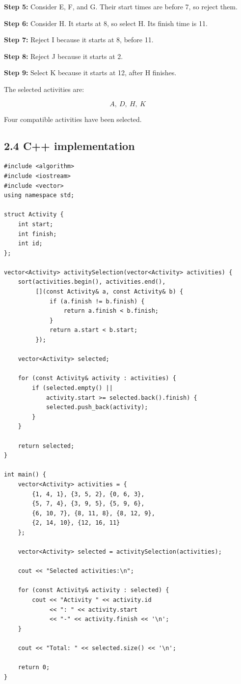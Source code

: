 \textbf{Step 5:} Consider E, F, and G. Their start times are before 7, so reject them.

\textbf{Step 6:} Consider H. It starts at 8, so select H. Its finish time is 11.

\textbf{Step 7:} Reject I because it starts at 8, before 11.

\textbf{Step 8:} Reject J because it starts at 2.

\textbf{Step 9:} Select K because it starts at 12, after H finishes.

The selected activities are:


\[
\boxed{A,\ D,\ H,\ K}
\]


Four compatible activities have been selected.

\subsection{2.4 C++ implementation}

\begin{lstlisting}[style=cppstyle]
#include <algorithm>
#include <iostream>
#include <vector>
using namespace std;

struct Activity {
    int start;
    int finish;
    int id;
};

vector<Activity> activitySelection(vector<Activity> activities) {
    sort(activities.begin(), activities.end(),
         [](const Activity& a, const Activity& b) {
             if (a.finish != b.finish) {
                 return a.finish < b.finish;
             }
             return a.start < b.start;
         });

    vector<Activity> selected;

    for (const Activity& activity : activities) {
        if (selected.empty() ||
            activity.start >= selected.back().finish) {
            selected.push_back(activity);
        }
    }

    return selected;
}

int main() {
    vector<Activity> activities = {
        {1, 4, 1}, {3, 5, 2}, {0, 6, 3},
        {5, 7, 4}, {3, 9, 5}, {5, 9, 6},
        {6, 10, 7}, {8, 11, 8}, {8, 12, 9},
        {2, 14, 10}, {12, 16, 11}
    };

    vector<Activity> selected = activitySelection(activities);

    cout << "Selected activities:\n";

    for (const Activity& activity : selected) {
        cout << "Activity " << activity.id
             << ": " << activity.start
             << "-" << activity.finish << '\n';
    }

    cout << "Total: " << selected.size() << '\n';

    return 0;
}
\end{lstlisting}


